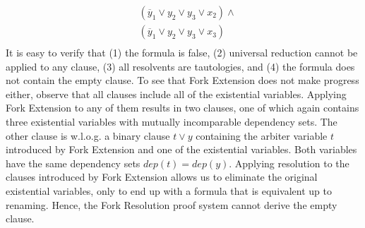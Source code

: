 \documentclass{svjour3}
\newcommand{\dep}{\mathit{dep}}
\begin{document}
\begin{example}
{\begin{align*}
&(\overline y_1 \lor y_2 \lor y_3 \lor x_2) \land\\
&(\overline y_1 \lor y_2 \lor y_3 \lor x_3) \\
\end{align*}
}
It is easy to verify that (1) the formula is false, (2) universal reduction cannot be applied to any clause, (3) all resolvents are tautologies, and (4) the formula does not contain the empty clause.
To see that Fork Extension does not make progress either, observe that all clauses include all of the existential variables.
Applying Fork Extension to any of them results in two clauses, one of which again contains three existential variables with mutually incomparable dependency sets.
The other clause is w.l.o.g. a binary clause $t\lor y$ containing the arbiter variable $t$ introduced by Fork Extension and one of the existential variables.
Both variables have the same dependency sets $\dep(t)=\dep(y)$.
Applying resolution to the clauses introduced by Fork Extension allows us to eliminate the original existential variables, only to end up with a formula that is equivalent up to renaming.
Hence, the Fork Resolution proof system cannot derive the empty clause.
\end{example}
\end{document}
